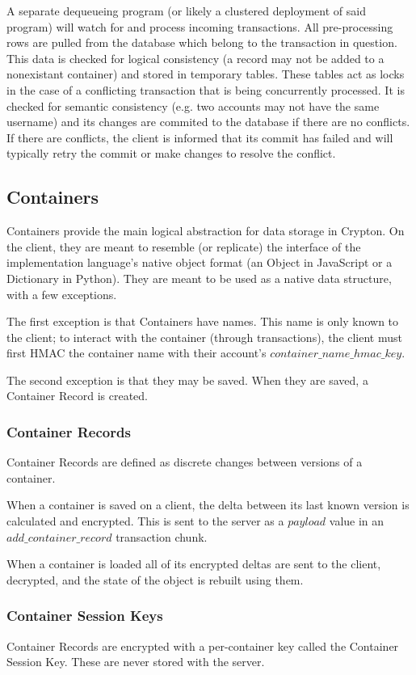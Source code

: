 \documentclass[conference]{IEEEtran}
\begin{document}
A separate dequeueing program (or likely a clustered deployment of said program) 
will watch for and process incoming transactions. All pre-processing rows are
pulled from the database which belong to the transaction in question. This
data is checked for logical consistency (a record may not be added to a
nonexistant container) and stored in temporary tables. These tables act as
locks in the case of a conflicting transaction that is being concurrently processed.
It is checked for semantic consistency (e.g. two accounts may not have the same username)
and its changes are commited to the database if there are no conflicts. If there are
conflicts, the client is informed that its commit has failed and will typically
retry the commit or make changes to resolve the conflict.

\subsection{Containers}
Containers provide the main logical abstraction for data storage in Crypton.
On the client, they are meant to resemble (or replicate) the interface of
the implementation language's native object format (an Object in JavaScript or
a Dictionary in Python). They are meant to be used as a native data structure,
with a few exceptions.

The first exception is that Containers have names. This name is only known to
the client; to interact with the container (through transactions),
the client must first HMAC the container name with their account's
\(container\_name\_hmac\_key\).

The second exception is that they may be saved. When they are saved, a
Container Record is created.

\subsubsection{Container Records}
Container Records are defined as discrete changes between versions of a
container.

When a container is saved on a client, the delta between its
last known version is calculated and encrypted. This is sent to the server
as a \(payload\) value in an \(add\_container\_record\) transaction chunk.

When a container is loaded all of its encrypted deltas are sent to the
client, decrypted, and the state of the object is rebuilt using them.

\subsubsection{Container Session Keys}
Container Records are encrypted with a per-container key called the Container
Session Key. These are never stored with the server.
\end{document}
